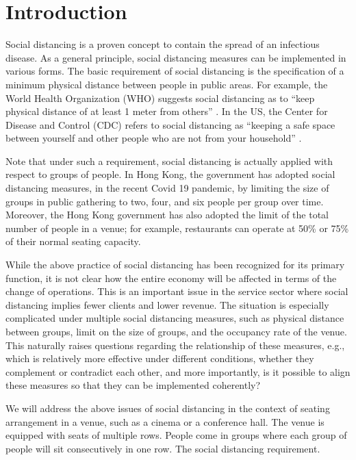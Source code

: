 \section{Introduction}
Social distancing is a proven concept to contain the spread of an infectious disease. As a general principle, social distancing measures can be implemented in various forms. The basic requirement of social distancing is the specification of a minimum physical distance between people in public areas. For example, the World Health Organization (WHO) suggests social distancing as to ``keep physical distance of at least 1 meter from others'' \cite{AdviceforPublic}. In the US, the Center for Disease and Control (CDC) refers to social distancing as ``keeping a safe space between yourself and other people who are not from your household'' \cite{CDC}. 

Note that under such a requirement, social distancing is actually applied with respect to groups of people. In Hong Kong, the government has adopted social distancing measures, in the recent Covid 19 pandemic, by limiting the size of groups in public gathering to two, four, and six people per group over time. Moreover, the Hong Kong government has also adopted the limit of the total number of people in a venue; for example, restaurants can operate at 50\% or 75\% of their normal seating capacity.


While the above practice of social distancing has been recognized for its primary function,  it is not clear how the entire economy will be affected in terms of the change of operations. This is an important issue in the service sector where social distancing implies fewer clients and lower revenue. The situation is especially complicated under multiple social distancing measures, such as physical distance between groups, limit on the size of groups, and the occupancy rate of the venue. This naturally raises questions regarding the relationship of these measures, e.g., which is relatively more effective under different conditions, whether they complement or contradict each other, and more importantly, is it possible to align these measures so that they can be implemented coherently? 


We will address the above issues of social distancing in the context of seating arrangement in a venue, such as a cinema or a conference hall. The venue is equipped with seats of multiple rows.  People come in groups where each group of people will sit consecutively in one row. The social distancing requirement.


